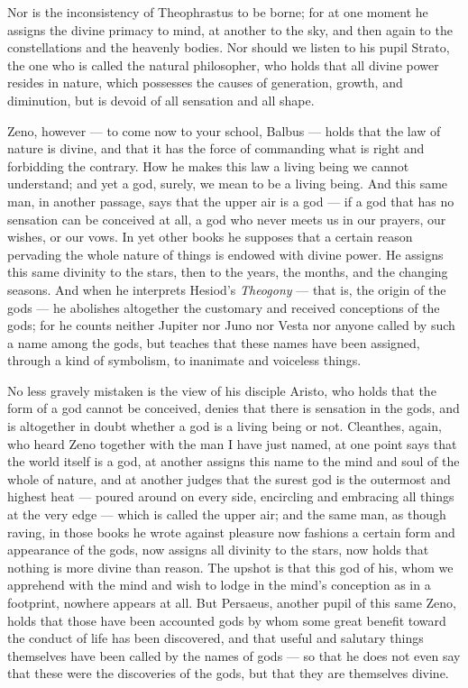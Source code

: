  Nor is the inconsistency of Theophrastus to be borne; for at one moment he assigns the divine primacy to mind, at another to the sky, and then again to the constellations and the heavenly bodies. Nor should we listen to his pupil Strato, the one who is called the natural philosopher, who holds that all divine power resides in nature, which possesses the causes of generation, growth, and diminution, but is devoid of all sensation and all shape.

 Zeno, however — to come now to your school, Balbus — holds that the law of nature is divine, and that it has the force of commanding what is right and forbidding the contrary. How he makes this law a living being we cannot understand; and yet a god, surely, we mean to be a living being. And this same man, in another passage, says that the upper air is a god — if a god that has no sensation can be conceived at all, a god who never meets us in our prayers, our wishes, or our vows. In yet other books he supposes that a certain reason pervading the whole nature of things is endowed with divine power. He assigns this same divinity to the stars, then to the years, the months, and the changing seasons. And when he interprets Hesiod's \textit{Theogony} — that is, the origin of the gods — he abolishes altogether the customary and received conceptions of the gods; for he counts neither Jupiter nor Juno nor Vesta nor anyone called by such a name among the gods, but teaches that these names have been assigned, through a kind of symbolism, to inanimate and voiceless things.

 No less gravely mistaken is the view of his disciple Aristo, who holds that the form of a god cannot be conceived, denies that there is sensation in the gods, and is altogether in doubt whether a god is a living being or not. Cleanthes, again, who heard Zeno together with the man I have just named, at one point says that the world itself is a god, at another assigns this name to the mind and soul of the whole of nature, and at another judges that the surest god is the outermost and highest heat — poured around on every side, encircling and embracing all things at the very edge — which is called the upper air; and the same man, as though raving, in those books he wrote against pleasure now fashions a certain form and appearance of the gods, now assigns all divinity to the stars, now holds that nothing is more divine than reason. The upshot is that this god of his, whom we apprehend with the mind and wish to lodge in the mind's conception as in a footprint, nowhere appears at all. But Persaeus, another pupil of this same Zeno, holds that those have been accounted gods by whom some great benefit toward the conduct of life has been discovered, and that useful and salutary things themselves have been called by the names of gods — so that he does not even say that these were the discoveries of the gods, but that they are themselves divine.


